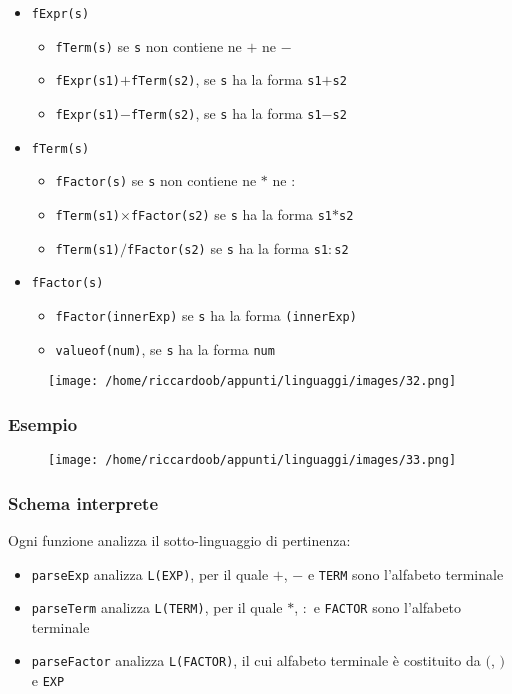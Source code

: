 \begin{itemize}
    \item \texttt{fExpr(s)}
    \begin{itemize}
        \item \texttt{fTerm(s)} se \texttt{s} non contiene ne $+$ ne $-$
        \item \texttt{fExpr(s1)}$+$\texttt{fTerm(s2)}, se \texttt{s} ha la forma \texttt{s1}$+$\texttt{s2}
        \item \texttt{fExpr(s1)}$-$\texttt{fTerm(s2)}, se \texttt{s} ha la forma \texttt{s1}$-$\texttt{s2}
    \end{itemize}
    \item \texttt{fTerm(s)}
    \begin{itemize}
        \item \texttt{fFactor(s)} se \texttt{s} non contiene ne $*$ ne $:$
        \item \texttt{fTerm(s1)}$\times$\texttt{fFactor(s2)} se \texttt{s} ha la forma \texttt{s1}$*$\texttt{s2}
        \item \texttt{fTerm(s1)}$/$\texttt{fFactor(s2)} se \texttt{s} ha la forma \texttt{s1}$:$\texttt{s2}
    \end{itemize}
    \item \texttt{fFactor(s)}
    \begin{itemize}
        \item \texttt{fFactor(innerExp)} se \texttt{s} ha la forma \texttt{(innerExp)}
        \item \texttt{valueof(num)}, se \texttt{s} ha la forma \texttt{num}
    \end{itemize}
\end{itemize}

\begin{figure}[H]
    \centering
    \texttt{[image: /home/riccardoob/appunti/linguaggi/images/32.png]}
\end{figure}
\subsubsection{Esempio}
\begin{figure}[H]
    \centering
    \texttt{[image: /home/riccardoob/appunti/linguaggi/images/33.png]}
\end{figure}

\subsubsection{Schema interprete}
Ogni funzione analizza il sotto-linguaggio di pertinenza:
\begin{itemize}
    \item \texttt{parseExp} analizza \texttt{L(EXP)}, per il quale $+$, $-$ e \texttt{TERM} sono l'alfabeto terminale
    \item \texttt{parseTerm} analizza \texttt{L(TERM)}, per il quale $*$, $:$ e \texttt{FACTOR} sono l'alfabeto terminale
    \item \texttt{parseFactor} analizza \texttt{L(FACTOR)}, il cui alfabeto terminale è costituito da $($, $)$ e \texttt{EXP}
\end{itemize}

